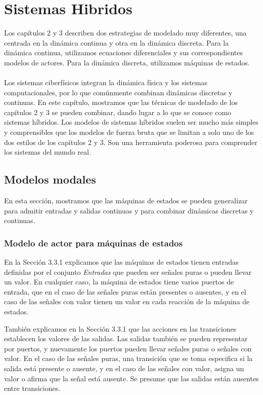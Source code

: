 

\section{Sistemas Hibridos}

Los capítulos 2 y 3 describen dos estrategias de modelado muy diferentes, una centrada en la dinámica continua y otra en la dinámica discreta. Para la dinámica continua, utilizamos ecuaciones diferenciales y sus correspondientes modelos de actores. Para la dinámica discreta, utilizamos máquinas de estados.
\ \ \\
Los sistemas ciberfísicos integran la dinámica física y los sistemas computacionales, por lo que comúnmente combinan dinámicas discretas y continuas. En este capítulo, mostramos que las técnicas de modelado de los capítulos 2 y 3 se pueden combinar, dando lugar a lo que se conoce como sistemas híbridos. Los modelos de sistemas híbridos suelen ser mucho más simples y comprensibles que los modelos de fuerza bruta que se limitan a solo uno de los dos estilos de los capítulos 2 y 3. Son una herramienta poderosa para comprender los sistemas del mundo real.

\subsection{Modelos modales}

En esta sección, mostramos que las máquinas de estados se pueden generalizar para admitir entradas y salidas continuas y para combinar dinámicas discretas y continuas.

\subsubsection{Modelo de actor para máquinas de estados}

En la Sección 3.3.1 explicamos que las máquinas de estados tienen entradas definidas por el conjunto \textit{Entradas} que pueden ser señales puras o pueden llevar un valor. En cualquier caso, la máquina de estados tiene varios puertos de entrada, que en el caso de las señales puras están presentes o ausentes, y en el caso de las señales con valor tienen un valor en cada reacción de la máquina de estados.

También explicamos en la Sección 3.3.1 que las acciones en las transiciones establecen los valores de las salidas. Las salidas también se pueden representar por puertos, y nuevamente los puertos pueden llevar señales puras o señales con valor. En el caso de las señales puras, una transición que se toma especifica si la salida está presente o ausente, y en el caso de las señales con valor, asigna un valor o afirma que la señal está ausente. Se presume que las salidas están ausentes entre transiciones.


